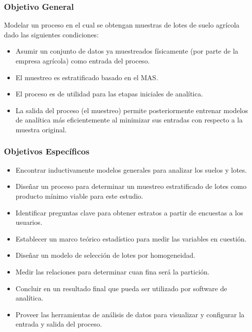 \documentclass[conference]{IEEEtran}
\begin{document}
\subsubsection{Objetivo General}

Modelar un proceso en el cual se obtengan muestras de lotes de suelo agrícola dado las siguientes condiciones:

\begin{itemize}
    \item Asumir un conjunto de datos ya muestreados físicamente (por parte de la empresa agrícola) como entrada del proceso.
    
    \item El muestreo es estratificado basado en el MAS.
    
    \item El proceso es de utilidad para las etapas iniciales de analítica.
    
    \item La salida del proceso (el muestreo) permite posteriormente entrenar modelos de analítica más eficientemente al minimizar sus entradas con respecto a la muestra original.
\end{itemize}

\subsubsection{Objetivos Específicos}

\begin{itemize}
    \item Encontrar inductivamente modelos generales para analizar los suelos y lotes. 
    
    \item Diseñar un proceso para determinar un muestreo estratificado de lotes como producto mínimo viable para este estudio.
    
    \item Identificar preguntas clave para obtener estratos a partir de encuestas a los usuarios.
    
    \item Establecer un marco teórico estadístico para medir las variables en cuestión.
    
    \item Diseñar un modelo de selección de lotes por homogeneidad.
    
    \item Medir las relaciones para determinar cuan fina será la partición.
    
    \item Concluir en un resultado final que pueda ser utilizado por software de analítica.
    
    \item Proveer las herramientas de análisis de datos para visualizar y configurar la entrada y salida del proceso.
\end{itemize}
\end{document}
